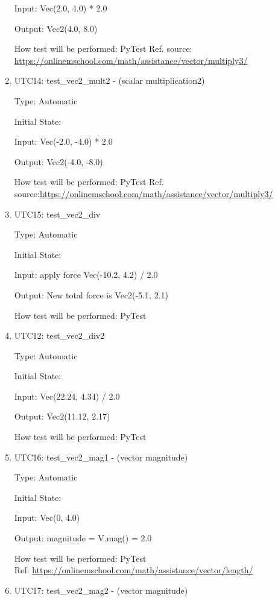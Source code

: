 \documentclass[12pt, titlepage]{article}
\begin{document}
\begin{enumerate}
	Input: Vec(2.0, 4.0) * 2.0
	
	Output: Vec2(4.0, 8.0)
	
	How test will be performed: PyTest
	Ref. source: \url{https://onlinemschool.com/math/assistance/vector/multiply3/}
	
	\item{UTC14}{: test\_vec2\_mult2 - (scalar multiplication2)\\}
	
	Type: Automatic
	
	Initial State: 
	
	Input:  Vec(-2.0, -4.0) * 2.0
	
	Output:  Vec2(-4.0, -8.0)
	
	How test will be performed: PyTest
	Ref. source:\url{https://onlinemschool.com/math/assistance/vector/multiply3/}
	
	\item{UTC15}{: test\_vec2\_div\\}
	
	Type: Automatic
	
	Initial State: 
	
	Input: apply force Vec(-10.2, 4.2) / 2.0
	
	Output: New total force is Vec2(-5.1, 2.1)
	
	How test will be performed: PyTest
	
	\item{UTC12}{: test\_vec2\_div2\\}
	
	Type: Automatic
	
	Initial State: 
	
	Input: Vec(22.24, 4.34) / 2.0
	
	Output: Vec2(11.12, 2.17)
	
	How test will be performed: PyTest
	
	\item{UTC16}{: test\_vec2\_mag1 - (vector magnitude)\\}
	
	Type: Automatic
	
	Initial State: 
	
	Input: Vec(0, 4.0)
	
	Output: magnitude = V.mag() = 2.0
	
	How test will be performed: PyTest\\
	Ref: \url{https://onlinemschool.com/math/assistance/vector/length/}
	
	\item{UTC17}{: test\_vec2\_mag2 - (vector magnitude)\\}
	

\end{enumerate}
\end{document}

